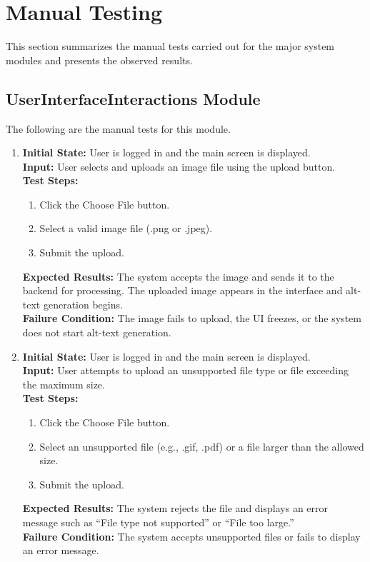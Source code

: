 \documentclass[12pt, titlepage]{article}
\begin{document}
\section{Manual Testing}
This section summarizes the manual tests carried out for the major
system modules and presents the observed results.

\subsection{UserInterfaceInteractions Module}
The following are the manual tests for this module.

\begin{enumerate}[label=UII-MT \arabic*., wide=0pt, leftmargin=*]
  \item{}
    {\bf Initial State:} User is logged in and the main screen is displayed. \\
    {\bf Input:} User selects and uploads an image file using the
    upload button. \\
    {\bf Test Steps:}
    \begin{enumerate}
      \item Click the Choose File button.
      \item Select a valid image file (.png or .jpeg).
      \item Submit the upload.
    \end{enumerate}
    {\bf  Expected Results:} The system accepts the image and sends
    it to the backend
    for processing. The uploaded image appears in the interface and
    alt-text generation begins. \\
    {\bf Failure Condition:} The image fails to upload, the UI
    freezes, or the system does
    not start alt-text generation.\\

  \item{}
    {\bf Initial State:} User is logged in and the main screen is displayed. \\
    {\bf Input:} User attempts to upload an unsupported file type or
    file exceeding the maximum size. \\
    {\bf Test Steps:}
    \begin{enumerate}
      \item Click the Choose File button.
      \item Select an unsupported file (e.g., .gif, .pdf) or a file
        larger than the allowed size.
      \item Submit the upload.
    \end{enumerate}
    {\bf  Expected Results:} The system rejects the file and displays
    an error message such as “File type
    not supported” or “File too large.” \\
    {\bf Failure Condition:} The system accepts unsupported files or
    fails to display an error message.\\


\end{enumerate}
\end{document}
